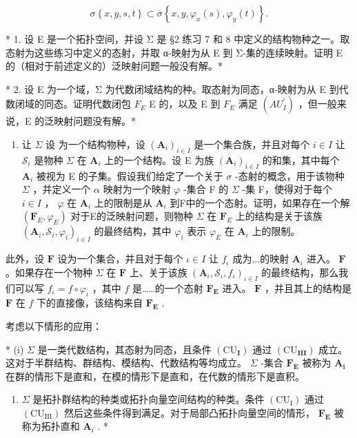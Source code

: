 \[
\sigma \left\{x, y, s, t \right\} \subset \overline {{\sigma}} \left\{x, y, \varphi_ {x} (s), \varphi_ {y} (t) \right\}.
\]

\exercisegroup

* 1. 设 E 是一个拓扑空间，并设 Σ 是 §2 练习 7 和 8 中定义的结构物种之一。取态射为这些练习中定义的态射，并取 α-映射为从 E 到 Σ-集的连续映射。证明 E 的（相对于前述定义的）泛映射问题一般没有解。*

* 2. 设 E 为一个域，Σ 为代数闭域结构的种。取态射为同态，α-映射为从 E 到代数闭域的同态。证明代数闭包 \(F_{E}\) E 的，以及 E 到 \(F_{E}\) 满足 \((AU_{I}^{\prime})\) ，但一般来说，E 的泛映射问题没有解。*

\begin{enumerate}
\def\labelenumi{\arabic{enumi}.}
\setcounter{enumi}{2}
\tightlist
\item
  让 \(\Sigma\) 设 为一个结构物种，设 \((\mathbf{A}_i)_{i \in I}\) 是一个集合族，并且对每个 \(i \in I\) 让 \(\mathcal{S}_i\) 是物种 \(\Sigma\) 在 \(\mathbf{A}_i\) 上的一个结构。设 E 为族 \((\mathbf{A}_i)_{i \in I}\) 的和集，其中每个 \(\mathbf{A}_i\) 被视为 E 的子集。假设我们给定了一个关于 \(\sigma\) -态射的概念，用于该物种 \(\Sigma\) ，并定义一个 \(\alpha\) 映射为一个映射 \(\varphi\) -集合 F 的 \(\Sigma\) -集 F，使得对于每个 \(i \in I\) ， \(\varphi\) 在 \(\mathbf{A}_i\) 上的限制是从 \(\mathbf{A}_i\) 到F中的一个态射。证明，如果存在一个解 \((\mathbf{F}_E, \varphi_E)\) 对于E的泛映射问题，则物种 \(\Sigma\) 在 \(\mathbf{F}_E\) 上的结构是关于该族 \((\mathbf{A}_i, \mathcal{S}_i, \varphi_i)_{i \in I}\) 的最终结构，其中 \(\varphi_i\) 表示 \(\varphi_E\) 在 \(\mathbf{A}_i\) 上的限制。
\end{enumerate}

此外，设 \(\mathbf{F}\) 设为一个集合，并且对于每个 \(\iota \in I\) 让 \(f_{\iota}\) 成为...的映射 \(\mathbf{A}_{\iota}\) 进入。 \(\mathbf{F}\) 。如果存在一个物种 \(\Sigma\) 在 \(\mathbf{F}\) 上、关于该族 \((\mathbf{A}_{\iota}, \mathcal{S}_{\iota}, f_{\iota})_{\iota \in I}\) 的最终结构，那么我们可以写 \(f_{\iota} = f \circ \varphi_{\iota}\) ，其中 \(f\) 是……的一个态射 \(\mathbf{F}_{\mathbf{E}}\) 进入。 \(\mathbf{F}\) ，并且其上的结构是 \(\mathbf{F}\) 在 \(f\) 下的直接像，该结构来自 \(\mathbf{F}_{\mathbf{E}}\) .

考虑以下情形的应用：

* (i) \(\Sigma\) 是一类代数结构，其态射为同态，且条件 \((\mathrm{CU}_{\mathbf{I}})\) 通过 \((\mathrm{CU}_{\mathbf{III}})\) 成立。这对于半群结构、群结构、模结构、代数结构等均成立。 \(\Sigma\) -集合 \(\mathbf{F}_{\mathbf{E}}\) 被称为 \(\mathbf{A}_{\mathbf{i}}\) 在群的情形下是直和，在模的情形下是直和，在代数的情形下是直积。

\begin{enumerate}
\def\labelenumi{(\roman{enumi})}
\setcounter{enumi}{1}
\tightlist
\item
  \(\Sigma\) 是拓扑群结构的种类或拓扑向量空间结构的种类。条件 \((\mathrm{CU}_{\mathrm{I}})\) 通过 \((\mathrm{CU}_{\mathrm{III}})\) 然后这些条件得到满足。对于局部凸拓扑向量空间的情形， \(\mathbf{F}_{\mathbf{E}}\) 被称为拓扑直和 \(\mathbf{A}_{i}\) . *
\end{enumerate}
